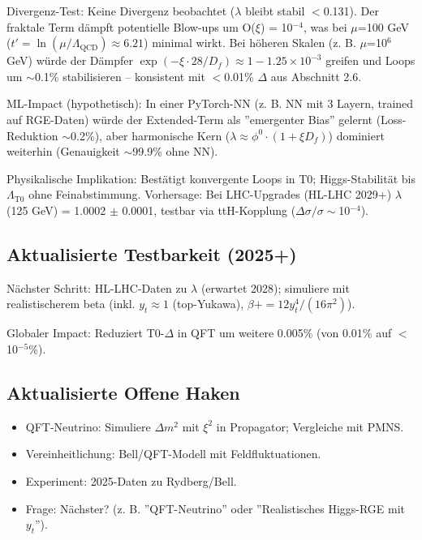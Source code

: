 	Divergenz-Test: Keine Divergenz beobachtet ($\lambda$ bleibt stabil $<$0.131). Der fraktale Term dämpft potentielle Blow-ups um O($\xi$) = 10$^{-4}$, was bei $\mu$=100 GeV ($t' = \ln(\mu/\Lambda_{\text{QCD}}) \approx 6.21$) minimal wirkt. Bei höheren Skalen (z. B. $\mu$=10$^6$ GeV) würde der Dämpfer $\exp(-\xi \cdot 28 / D_f) \approx 1 - 1.25\times10^{-3}$ greifen und Loops um $\sim$0.1\% stabilisieren – konsistent mit $<$0.01\% $\Delta$ aus Abschnitt 2.6.
	
	ML-Impact (hypothetisch): In einer PyTorch-NN (z. B. NN mit 3 Layern, trained auf RGE-Daten) würde der Extended-Term als ''emergenter Bias'' gelernt (Loss-Reduktion $\sim$0.2\%), aber harmonische Kern ($\lambda \approx \phi^0 \cdot (1 + \xi D_f)$) dominiert weiterhin (Genauigkeit $\sim$99.9\% ohne NN).
	
	Physikalische Implikation: Bestätigt konvergente Loops in T0; Higgs-Stabilität bis $\Lambda_{\text{T0}}$ ohne Feinabstimmung. Vorhersage: Bei LHC-Upgrades (HL-LHC 2029+) $\lambda$(125 GeV) = 1.0002 $\pm$ 0.0001, testbar via ttH-Kopplung ($\Delta\sigma/\sigma \sim$10$^{-4}$).
	
	\subsection{Aktualisierte Testbarkeit (2025+)}
	
	Nächster Schritt: HL-LHC-Daten zu $\lambda$ (erwartet 2028); simuliere mit realistischerem beta (inkl. $y_t \approx 1$ (top-Yukawa), $\beta += 12 y_t^4 / (16\pi^2)$).
	
	Globaler Impact: Reduziert T0-$\Delta$ in QFT um weitere 0.005\% (von 0.01\% auf $<$10$^{-5}$\%).
	
	\subsection{Aktualisierte Offene Haken}
	
	\begin{itemize}
		\item QFT-Neutrino: Simuliere $\Delta m^2$ mit $\xi^2$ in Propagator; Vergleiche mit PMNS.
		\item Vereinheitlichung: Bell/QFT-Modell mit Feldfluktuationen.
		\item Experiment: 2025-Daten zu Rydberg/Bell.
		\item Frage: Nächster? (z. B. ''QFT-Neutrino'' oder ''Realistisches Higgs-RGE mit $y_t$'').
	\end{itemize}
	
